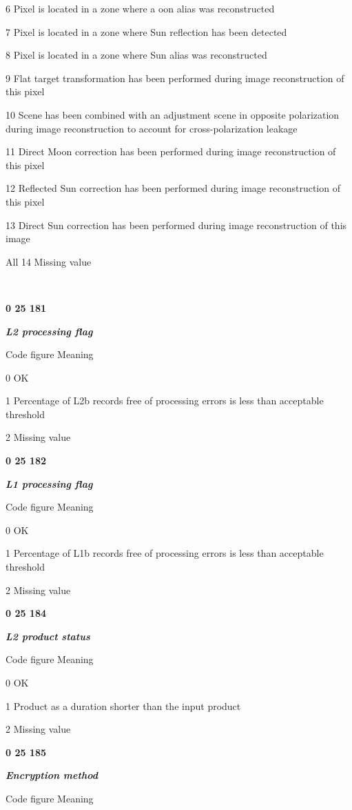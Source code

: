 6 Pixel is located in a zone where a oon alias was reconstructed

7 Pixel is located in a zone where Sun reflection has been detected

8 Pixel is located in a zone where Sun alias was reconstructed

9 Flat target transformation has been performed during image reconstruction of this pixel

10 Scene has been combined with an adjustment scene in opposite polarization during image reconstruction to account for cross-polarization leakage

11 Direct Moon correction has been performed during image reconstruction of this pixel

12 Reflected Sun correction has been performed during image reconstruction of this pixel

13 Direct Sun correction has been performed during image reconstruction of this image

All 14 Missing value

\textbf{\\
}

\textbf{0 25 181}

\emph{\textbf{L2 processing flag}}

Code figure Meaning

0 OK

1 Percentage of L2b records free of processing errors is less than acceptable threshold

2 Missing value

\textbf{0 25 182}

\emph{\textbf{L1 processing flag}}

Code figure Meaning

0 OK

1 Percentage of L1b records free of processing errors is less than acceptable threshold

2 Missing value

\textbf{0 25 184}

\emph{\textbf{L2 product status}}

Code figure Meaning

0 OK

1 Product as a duration shorter than the input product

2 Missing value

\textbf{0 25 185}

\emph{\textbf{Encryption method}}

Code figure Meaning


